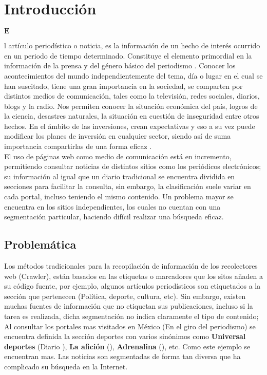 	
\chapter{Introducción}


\begin{Large}$\mathbf{E}$\end{Large}l artículo periodístico o noticia, es la información de un hecho de interés ocurrido en un periodo de tiempo determinado. Constituye el elemento primordial en la información de la prensa y del género básico del periodismo \cite{uno}. Conocer los acontecimientos del mundo independientemente del tema, día o lugar en el cual se han suscitado, tiene una gran importancia en la sociedad, se comparten por distintos medios de comunicación, tales como la televisión, redes sociales, diarios, blogs y la radio. Nos permiten conocer la situación económica del país, logros de la ciencia, desastres naturales, la situación en cuestión de inseguridad entre otros hechos. En el ámbito de las inversiones, crean expectativas y eso a su vez puede modificar los planes de inversión en cualquier sector, siendo así de suma importancia compartirlas de una forma eficaz \cite{dos}.\\

El uso de páginas web como medio de comunicación está en incremento, permitiendo consultar noticias de distintos sitios como los periódicos electrónicos; su información al igual que un diario tradicional se encuentra dividida en secciones para facilitar la consulta, sin embargo, la clasificación suele variar en cada portal, incluso teniendo el mismo contenido. Un problema mayor se encuentra en los sitios independientes, los cuales no cuentan con una segmentación particular, haciendo difícil realizar una búsqueda eficaz.\\



\section{Problemática}


Los métodos tradicionales para la recopilación de información de los recolectores web (Crawler), están basados en las etiquetas o marcadores que los sitos añaden a su código fuente, por ejemplo, algunos artículos periodísticos son etiquetados a la sección que pertenecen (Política, deporte, cultura, etc). Sin embargo, existen muchas fuentes de información que no etiquetan sus publicaciones, incluso si la tarea es realizada, dicha segmentación no indica claramente el tipo de contenido; Al consultar los portales mas visitados en México (En el giro del periodismo) se encuentra definida la sección deportes con varios sinónimos como \textbf{Universal deportes} (Diario ), \textbf{La afición} (), \textbf{Adrenalina} (), etc. Como este ejemplo se encuentran mas. Las noticias son segmentadas de forma tan diversa que ha complicado su búsqueda en la Internet.\\


